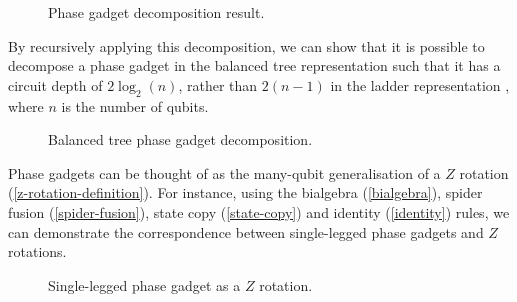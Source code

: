 \begin{figure}[H]
    \centering
    \caption{Phase gadget decomposition result.}
    \label{phase-gadget-decomposition}
\end{figure}

By recursively applying this decomposition, we can show that it is possible to decompose a phase gadget in the balanced tree representation such that it has a circuit depth of $2\log_2(n)$, rather than $2(n-1)$ in the ladder representation \cite{Cowtan2019}, where $n$ is the number of qubits.

\begin{figure}[H]
    \centering
    \caption{Balanced tree phase gadget decomposition.}
    \label{balanced-tree}
\end{figure}


Phase gadgets can be thought of as the many-qubit generalisation of a $Z$ rotation (\ref{z-rotation-definition}). For instance, using the bialgebra (\ref{bialgebra}), spider fusion (\ref{spider-fusion}), state copy (\ref{state-copy}) and identity (\ref{identity}) rules, we can demonstrate the correspondence between single-legged phase gadgets and $Z$ rotations.

\begin{figure}[H]
    \centering
    \caption{Single-legged phase gadget as a $Z$ rotation.}
    \label{phase-gadget-single-leg}
\end{figure}

